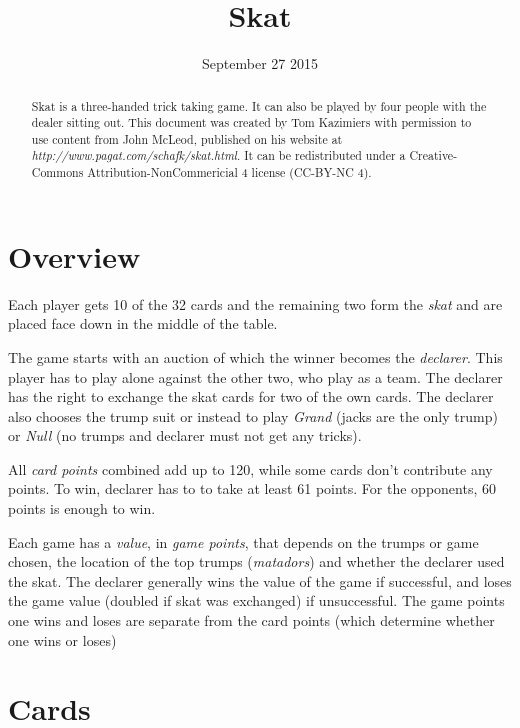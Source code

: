 \documentclass[letter]{article}
\begin{document}
\title{Skat}
  \date{\small{September 27 2015}}
  \maketitle

  \begin{abstract}
    Skat is a three-handed trick taking game. It can also be played by four
    people with the dealer sitting out. This document was created by Tom
    Kazimiers with permission to use content from John McLeod, published on his
    website at \emph{http://www.pagat.com/schafk/skat.html}. It can be
    redistributed under a Creative-Commons Attribution-NonCommericial 4
    license (CC-BY-NC 4).
  \end{abstract}

  \section*{Overview}

  Each player gets 10 of the 32 cards and the remaining two form the
  \emph{skat} and are placed face down in the middle of the table.

  The game starts with an auction of which the winner becomes the
  \emph{declarer}. This player has to play alone against the other two, who play
  as a team. The declarer has the right to exchange the skat cards for two of
  the own cards. The declarer also chooses the trump suit or instead to play
  \emph{Grand} (jacks are the only trump) or \emph{Null} (no trumps and declarer
  must not get any tricks).

  All \emph{card points} combined add up to 120, while some cards don't
  contribute any points. To win, declarer has to to take at least 61 points. For
  the opponents, 60 points is enough to win.

  Each game has a \emph{value}, in \emph{game points}, that depends on the
  trumps or game chosen, the location of the top trumps (\emph{matadors}) and
  whether the declarer used the skat. The declarer generally wins the value of
  the game if successful, and loses the game value (doubled if skat was
  exchanged) if unsuccessful. The game points one wins and loses are separate
  from the card points (which determine whether one wins or loses)


  \section*{Cards}
  
\end{document}
